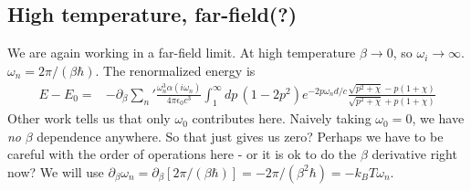 \subsection{High temperature, far-field(?)}

We are again working in a far-field limit.
  At high temperature $\beta\rightarrow 0$, so $\omega_i\rightarrow \infty$.
  $\omega_n = 2\pi/(\beta\hbar)$.  
The renormalized energy is 
\begin{align}
E-E_0=& -\partial_\beta{\sum_n}'\frac{\omega^3_n\alpha(i\omega_n)}{4\pi\epsilon_0c^3}\int_1^\infty dp\,
\left(1-2p^2\right)e^{-2p\omega_n d/c}\frac{\sqrt{p^2+\chi}-p(1+\chi)}{\sqrt{p^2+\chi}+p (1+\chi)} 
\end{align}
Other work tells us that only $\omega_0$ contributes here.
  Naively taking $\omega_0=0$, we have \emph{no} $\beta$ dependence anywhere.
  So that just gives us zero?  Perhaps we have to be careful with the order of operations here 
- or it is ok to do the $\beta$ derivative right now?
  We will use $\partial_\beta\omega_n = \partial_\beta[2\pi/(\beta\hbar)] = -2\pi/(\beta^2\hbar) = -k_BT \omega_n$.


